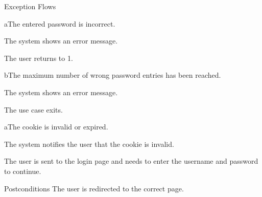 \begin{cpartList}{Exception Flows}
  \begin{innerList}{2}{a}{The entered password is incorrect.}
    \item The system shows an error message.
    \item The user returns to 1.
  \end{innerList}
  \begin{innerList}{2}{b}{The maximum number of wrong password entries has been reached.}
    \item The system shows an error message.
    \item The use case exits.
  \end{innerList}
  \begin{innerList}{3}{a}{The cookie is invalid or expired.}
    \item The system notifies the user that the cookie is invalid.
    \item The user is sent to the login page and needs to enter the username and password to continue.
  \end{innerList}
\end{cpartList}

\begin{cpart}{Postconditions}
The user is redirected to the correct page.
\end{cpart}

